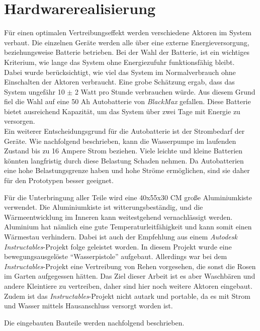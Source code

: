 

\section{Hardwarerealisierung}

Für einen optimalen Vertreibungseffekt werden verschiedene Aktoren im System verbaut. Die einzelnen Geräte werden alle über eine externe Energieversorgung, beziehungsweise Batterie betrieben. Bei der Wahl der Batterie, ist ein wichtiges Kriterium, wie lange das System ohne Energiezufuhr funktionsfähig bleibt.
\\
Dabei wurde berücksichtigt, wie viel das System im Normalverbrauch ohne Einschalten der Aktoren verbraucht. Eine grobe Schätzung ergab, dass das System ungefähr 10 $\pm$ 2 Watt pro Stunde verbrauchen würde. Aus diesem Grund fiel die Wahl auf eine 50 Ah Autobatterie von \textit{BlackMax} \cite{Autobatterie} gefallen. Diese Batterie bietet ausreichend Kapazität, um das System über zwei Tage mit Energie zu versorgen.
\\
Ein weiterer Entscheidungsgrund für die Autobatterie ist der Strombedarf der Geräte. Wie nachfolgend beschrieben, kann die Wasserpumpe im laufenden Zustand bis zu 16 Ampere Strom beziehen. Viele leichte und kleine Batterien könnten langfristig durch diese Belastung Schaden nehmen. Da Autobatterien eine hohe Belastungsgrenze haben und hohe Ströme ermöglichen, sind sie daher für den Prototypen besser geeignet.

Für die Unterbringung aller Teile wird eine 40x55x30 \ac{CM} große Aluminiumkiste verwendet. Die Aluminiumkiste ist witterungsbeständig, und die Wärmeentwicklung im Inneren kann weitestgehend vernachlässigt werden. Aluminium hat nämlich eine gute Temperaturleitfähigkeit und kann somit einen Wärmestau verhindern. Dabei ist auch der Empfehlung aus einem \textit{Autodesk Instructables}-Projekt folge geleistet worden. In diesem Projekt wurde eine bewegungsausgelöste "`Wasserpistole"' aufgebaut. Allerdings war bei dem \textit{Instructables}-Projekt eine Vertreibung von Rehen vorgesehen, die sonst die Rosen im Garten aufgegessen hätten. Das Ziel dieser Arbeit ist es aber Waschbären und andere Kleintiere zu vertreiben, daher sind hier noch weitere Aktoren eingebaut. Zudem ist das \textit{Instructables}-Projekt nicht autark und portable, da es mit Strom und Wasser mittels Hausanschluss versorgt worden ist. \cite{watergun_dude}

Die eingebauten Bauteile werden nachfolgend beschrieben.

